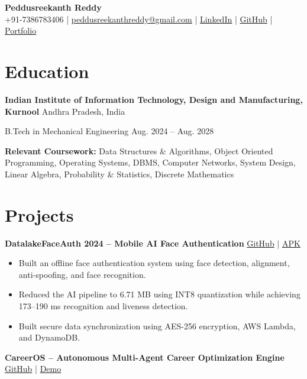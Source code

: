 \documentclass[10pt,a4paper]{article}
\begin{document}
\begin{center}
    {\LARGE \textbf{Peddusreekanth Reddy}} \\[2pt]
    +91-7386783406 \;|\;
    \href{mailto:peddusreekanthreddy@gmail.com}
    {peddusreekanthreddy@gmail.com}
    \;|\;
    \href{https://www.linkedin.com/in/sreekanth-reddy-peddu-725584342/}{LinkedIn}
    \;|\;
    \href{https://github.com/peddusreekanthreddy7}{GitHub}
    \;|\;
    \href{https://www.askd.in/}{Portfolio}
\end{center}

\section{Education}

\textbf{Indian Institute of Information Technology, Design and Manufacturing, Kurnool}
\hfill Andhra Pradesh, India

B.Tech in Mechanical Engineering
\hfill Aug. 2024 -- Aug. 2028

\textbf{Relevant Coursework:}
Data Structures \& Algorithms, Object Oriented Programming, Operating Systems,
DBMS, Computer Networks, System Design, Linear Algebra, Probability \& Statistics,
Discrete Mathematics

\section{Projects}

\textbf{DatalakeFaceAuth 2024 -- Mobile AI Face Authentication}
\hfill
\href{https://github.com/peddusreekanthreddy7/HACKATHON-7.1}{GitHub}
\;|\;
\href{https://drive.google.com/file/d/1D1_aZa0OtnO3WXjK7u3aJQSOe8dDz2fO/view?usp=sharing}{APK}

\begin{itemize}
    \item Built an offline face authentication system using face detection, alignment, anti-spoofing, and face recognition.
    \item Reduced the AI pipeline to 6.71 MB using INT8 quantization while achieving 173--190 ms recognition and liveness detection.
    \item Built secure data synchronization using AES-256 encryption, AWS Lambda, and DynamoDB.
\end{itemize}

\textbf{CareerOS -- Autonomous Multi-Agent Career Optimization Engine}
\hfill
\href{https://github.com/peddusreekanthreddy7/careeross}{GitHub}
\;|\;
\href{https://youtu.be/9cqEbAvRIYY?si=-A6D0WofPAe8BnLi}{Demo}
\end{document}

